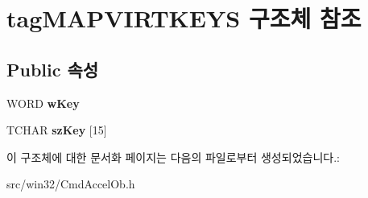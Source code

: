 \hypertarget{structtag_m_a_p_v_i_r_t_k_e_y_s}{}\section{tag\+M\+A\+P\+V\+I\+R\+T\+K\+E\+YS 구조체 참조}
\label{structtag_m_a_p_v_i_r_t_k_e_y_s}
\subsection*{Public 속성}
\begin{DoxyCompactItemize}
\item 
\mbox{\label{structtag_m_a_p_v_i_r_t_k_e_y_s_aa21999ab90fcd0989352e3914fd796d7}} 
W\+O\+RD {\bfseries w\+Key}
\item 
\mbox{\label{structtag_m_a_p_v_i_r_t_k_e_y_s_a8450e89846bdbfa3f2daeec9583dfd15}} 
T\+C\+H\+AR {\bfseries sz\+Key} \mbox{[}15\mbox{]}
\end{DoxyCompactItemize}


이 구조체에 대한 문서화 페이지는 다음의 파일로부터 생성되었습니다.\+:\begin{DoxyCompactItemize}
\item 
src/win32/Cmd\+Accel\+Ob.\+h\end{DoxyCompactItemize}
